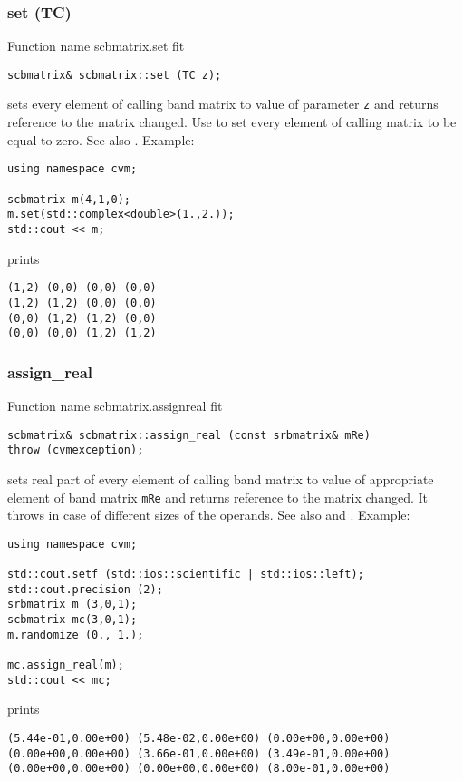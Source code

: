 \subsubsection{set (TC)}
Function%
\pdfdest name {scbmatrix.set} fit
\begin{verbatim}
scbmatrix& scbmatrix::set (TC z);
\end{verbatim}
sets every element of  calling band matrix to  value of
parameter \verb"z" and returns  reference to
the matrix changed.
Use  to set every element
of  calling matrix to be equal to zero.
See also .
Example:
\begin{Verbatim}
using namespace cvm;

scbmatrix m(4,1,0);
m.set(std::complex<double>(1.,2.));
std::cout << m;
\end{Verbatim}
prints
\begin{Verbatim}
(1,2) (0,0) (0,0) (0,0)
(1,2) (1,2) (0,0) (0,0)
(0,0) (1,2) (1,2) (0,0)
(0,0) (0,0) (1,2) (1,2)
\end{Verbatim}
\newpage




\subsubsection{assign\_real}
Function%
\pdfdest name {scbmatrix.assignreal} fit
\begin{verbatim}
scbmatrix& scbmatrix::assign_real (const srbmatrix& mRe)
throw (cvmexception);
\end{verbatim}
sets real part of every element of  calling band matrix to  value of
appropriate element of  band matrix \verb"mRe"
and returns  reference to
the matrix changed.
It throws  
in case of different sizes of the operands.
See also  and .
Example:
\begin{Verbatim}
using namespace cvm;

std::cout.setf (std::ios::scientific | std::ios::left); 
std::cout.precision (2);
srbmatrix m (3,0,1);
scbmatrix mc(3,0,1);
m.randomize (0., 1.);

mc.assign_real(m);
std::cout << mc;
\end{Verbatim}
prints
\begin{Verbatim}
(5.44e-01,0.00e+00) (5.48e-02,0.00e+00) (0.00e+00,0.00e+00)
(0.00e+00,0.00e+00) (3.66e-01,0.00e+00) (3.49e-01,0.00e+00)
(0.00e+00,0.00e+00) (0.00e+00,0.00e+00) (8.00e-01,0.00e+00)
\end{Verbatim}
\newpage




